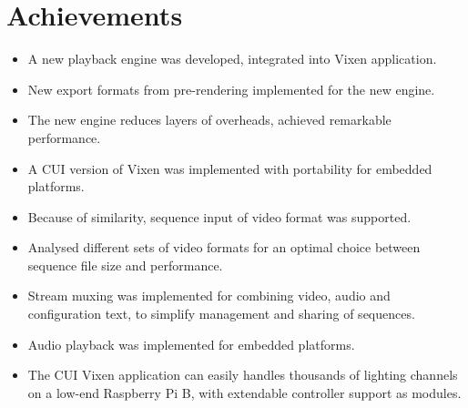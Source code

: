 \section{Achievements}


\begin{itemize}[noitemsep]
  \item A new playback engine was developed, integrated into Vixen application.
  \item New export formats from pre-rendering implemented for the new engine.
  \item The new engine reduces layers of overheads, achieved remarkable performance.
  \item A CUI version of Vixen was implemented with portability for embedded platforms.
  \item Because of similarity, sequence input of video format was supported.
  \item Analysed different sets of video formats for an optimal choice between sequence file size and performance.
  \item Stream muxing was implemented for combining video, audio and configuration text, to simplify management and sharing of sequences.
  \item Audio playback was implemented for embedded platforms.
  \item The CUI Vixen application can easily handles thousands of lighting channels on a low-end Raspberry Pi B, with extendable controller support as modules.
\end{itemize}

